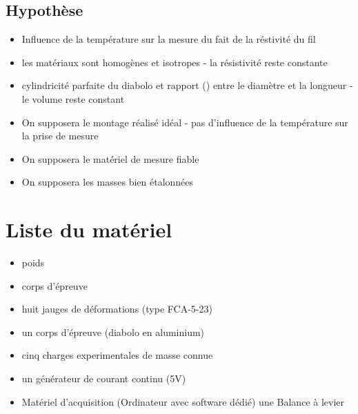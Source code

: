 \documentclass[11pt,a4paper]{report}
\begin{document}
\subsection*{Hypothèse}
\begin{itemize}
\item Influence de la température sur la mesure du fait de la réstivité du fil 
\item les matériaux sont homogènes et isotropes - la résistivité reste constante
\item cylindricité parfaite du diabolo et rapport () entre le diamètre et la longueur - le volume reste constant
\item On supposera le montage réalisé idéal - pas d'influence de la température sur la prise de mesure
\item On supposera le matériel de mesure fiable
\item On supposera les masses bien étalonnées
\end{itemize}	

\section*{Liste du matériel}
\begin{itemize}
\item poids 
\item corps d'épreuve
\item huit jauges de déformations (type FCA-5-23)
\item un corps d'épreuve (diabolo en aluminium)
\item cinq charges experimentales de masse connue
\item un générateur de courant continu (5V)
\item Matériel d'acquisition (Ordinateur avec software dédié)   une Balance à levier
\end{itemize}	
\end{document}
